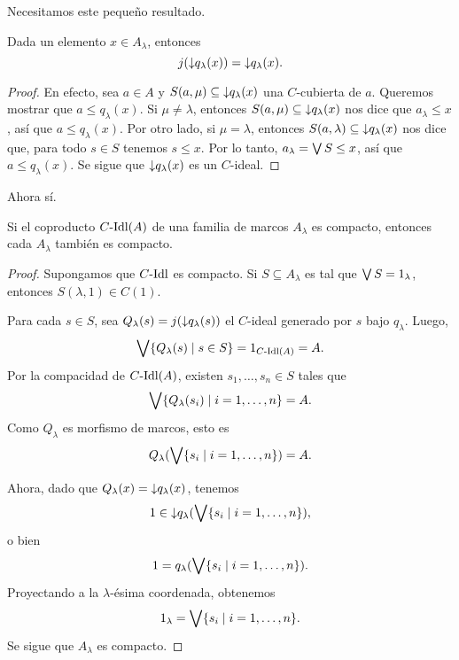Necesitamos este pequeño resultado.
\begin{lemma}
Dada un elemento $x\in A_\lambda$, entonces
\[
    j({\downarrow} q_\lambda(x)) = {\downarrow} q_\lambda(x)
.\]
\end{lemma}
\begin{proof}
    En efecto, sea $a\in A$ y $S(a,\mu)\subseteq{\downarrow} q_\lambda(x)$
    una $C$-cubierta de $a$.
    Queremos mostrar que $a\leq q_\lambda(x)$.
    Si $\mu\neq\lambda$, entonces $S(a,\mu)\subseteq {\downarrow} q_\lambda(x)$
    nos dice que $a_\lambda\leq x$, así que $a\leq q_\lambda(x)$.
    Por otro lado, si $\mu=\lambda$, entonces
    $S(a,\lambda) \subseteq {\downarrow} q_\lambda(x)$ nos dice que, para todo
    $s\in S$ tenemos $s\leq x$.
    Por lo tanto, $a_\lambda=\bigvee S\leq x$, así que $a\leq q_\lambda(x)$.
    Se sigue que ${\downarrow} q_\lambda(x)$ es un $C$-ideal.
\end{proof}
Ahora sí.

\begin{lemma}
    Si el coproducto $C\text{-}\mathrm{Idl}(A)$ de una familia de marcos
    $A_\lambda$ es compacto, entonces cada $A_\lambda$
    también es compacto.
\end{lemma}
\begin{proof}
    Supongamos que $C\text{-}\mathrm{Idl}$ es compacto.
    Si $S\subseteq A_\lambda$ es tal que $\bigvee S=1_\lambda$,
    entonces $S(\lambda,1)\in C(1)$.
    
    Para cada $s\in S$, sea $Q_\lambda(s)
    = j({\downarrow} q_\lambda(s))$
    el $C$-ideal generado por $s$ bajo $q_\lambda$.
    Luego,
    \[
        \bigvee\{Q_\lambda(s) \mid s\in S\} = 1_{C\text{-}\mathrm{Idl}(A)} = A
    .\]
    Por la compacidad de $C\text{-}\mathrm{Idl}(A)$,
    existen $s_1,\dots,s_n\in S$ tales que
    \[
        \bigvee\{Q_\lambda(s_i) \mid i=1,\dots,n\} = A
    .\]
    Como $Q_\lambda$ es morfismo de marcos, esto es
    \[
        Q_\lambda(\bigvee\{s_i \mid i=1,\dots,n\}) = A
    .\]
    
    Ahora, dado que $Q_\lambda(x) = {\downarrow} q_\lambda(x)$, tenemos
    \[
        1 \in {\downarrow} q_\lambda(\bigvee\{s_i \mid i=1,\dots,n\})
    ,\]
    o bien
    \[
        1 = q_\lambda(\bigvee\{s_i \mid i=1,\dots,n\})
    .\]
    Proyectando a la $\lambda$-ésima coordenada, obtenemos
    \[
        1_\lambda = \bigvee\{s_i \mid i=1,\dots,n\}
    .\]
    Se sigue que $A_\lambda$ es compacto.
\end{proof}

